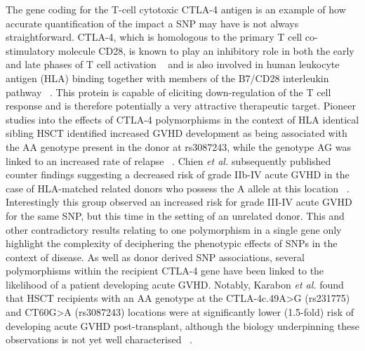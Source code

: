 The gene coding for the T-cell cytotoxic CTLA-4 antigen is an example of how accurate quantification of the impact a SNP may have is not always straightforward. CTLA-4, which is homologous to the primary T cell co-stimulatory molecule CD28, is known to play an inhibitory role in both the early and late phases of T cell activation ~\autocite{Kar2015} and is also involved in human leukocyte antigen (HLA) binding together with members of the B7/CD28 interleukin pathway ~\autocite{Dic2012}. This protein is capable of eliciting down-regulation of the T cell response and is therefore potentially a very attractive therapeutic target. Pioneer studies into the effects of CTLA-4 polymorphisms in the context of HLA identical sibling HSCT identified increased GVHD development as being associated with the AA genotype present in the donor at rs3087243, while the genotype AG was linked to an increased rate of relapse ~\autocite{Dic2012}. Chien \textit{et al.} subsequently published counter findings suggesting a decreased risk of grade IIb-IV acute GVHD in the case of HLA-matched related donors who possess the A allele at this location ~\autocite{Chi2012}. Interestingly this group observed an increased risk for grade III-IV acute GVHD for the same SNP, but this time in the setting of an unrelated donor. This and other contradictory results relating to one polymorphism in a single gene only highlight the complexity of deciphering the phenotypic effects of SNPs in the context of disease. As well as donor derived SNP associations,  several polymorphisms within the recipient CTLA-4 gene have been linked to the likelihood of a patient developing acute GVHD.  Notably, Karabon \textit{et al.} found that HSCT recipients with an AA genotype at the CTLA-4c.49A>G (rs231775) and CT60G>A (rs3087243) locations were at significantly lower (1.5-fold) risk of developing acute GVHD post-transplant, although the biology underpinning these observations is not yet well characterised ~\autocite{Kar2015}. 

